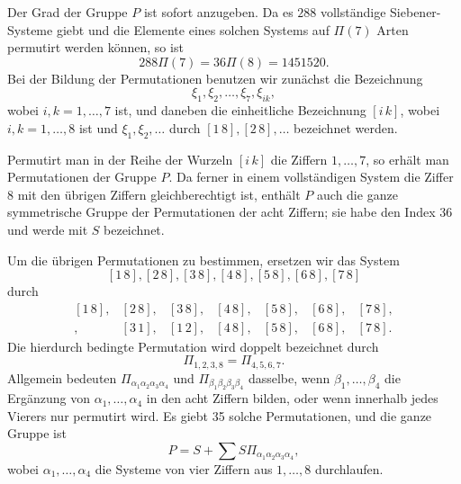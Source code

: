 \documentclass[11pt]{article}
\providecommand{\pair}[2]{[#1\,#2]}
\begin{document}
Der Grad der Gruppe \(P\) ist sofort anzugeben. Da es \(288\) vollständige Siebener-Systeme giebt und die Elemente eines solchen Systems auf \(\Pi(7)\) Arten permutirt werden können, so ist
\[
 288\Pi(7)=36\Pi(8)=1451520.
\]
Bei der Bildung der Permutationen benutzen wir zunächst die Bezeichnung
\begin{equation}
 \xi_1,\xi_2,\ldots,\xi_7,\xi_{ik}, \tag{1}
\end{equation}
wobei \(i,k=1,\ldots,7\) ist, und daneben die einheitliche Bezeichnung \(\pair{i}{k}\), wobei \(i,k=1,\ldots,8\) ist und \(\xi_1,\xi_2,\ldots\) durch \(\pair{1}{8},\pair{2}{8},\ldots\) bezeichnet werden.

Permutirt man in der Reihe der Wurzeln \(\pair{i}{k}\) die Ziffern \(1,\ldots,7\), so erhält man Permutationen der Gruppe \(P\). Da ferner in einem vollständigen System die Ziffer 8 mit den übrigen Ziffern gleichberechtigt ist, enthält \(P\) auch die ganze symmetrische Gruppe der Permutationen der acht Ziffern; sie habe den Index 36 und werde mit \(S\) bezeichnet.

Um die übrigen Permutationen zu bestimmen, ersetzen wir das System
\[
 \pair{1}{8},\pair{2}{8},\pair{3}{8},\pair{4}{8},\pair{5}{8},\pair{6}{8},\pair{7}{8}
\]
durch
\begin{equation}
\begin{array}{rrrrrrr}
\pair{1}{8},&\pair{2}{8},&\pair{3}{8},&\pair{4}{8},&\pair{5}{8},&\pair{6}{8},&\pair{7}{8},\\
\pair{2}{3},&\pair{3}{1},&\pair{1}{2},&\pair{4}{8},&\pair{5}{8},&\pair{6}{8},&\pair{7}{8}.
\end{array} \tag{2}
\end{equation}
Die hierdurch bedingte Permutation wird doppelt bezeichnet durch
\begin{equation}
 \Pi_{1,2,3,8}=\Pi_{4,5,6,7}. \tag{3}
\end{equation}
Allgemein bedeuten \(\Pi_{\alpha_1\alpha_2\alpha_3\alpha_4}\) und \(\Pi_{\beta_1\beta_2\beta_3\beta_4}\) dasselbe, wenn \(\beta_1,\ldots,\beta_4\) die Ergänzung von \(\alpha_1,
\ldots,\alpha_4\) in den acht Ziffern bilden, oder wenn innerhalb jedes Vierers nur permutirt wird. Es giebt 35 solche Permutationen, und die ganze Gruppe ist
\begin{equation}
 P=S+\sum S\Pi_{\alpha_1\alpha_2\alpha_3\alpha_4}, \tag{4}
\end{equation}
wobei \(\alpha_1,
\ldots,
\alpha_4\) die Systeme von vier Ziffern aus \(1,
\ldots,8\) durchlaufen.
\end{document}
